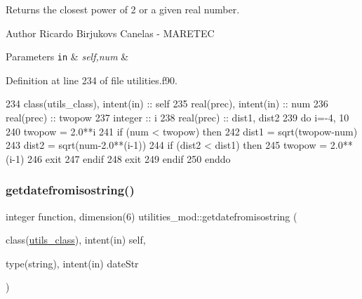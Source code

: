Returns the closest power of 2 or a given real number. 

\begin{DoxyAuthor}{Author}
Ricardo Birjukovs Canelas -\/ M\+A\+R\+E\+T\+EC 
\end{DoxyAuthor}

\begin{DoxyParams}[1]{Parameters}
\mbox{\tt in}  & {\em self,num} & \\
\hline
\end{DoxyParams}


Definition at line 234 of file utilities.\+f90.


\begin{DoxyCode}
234     \textcolor{keywordtype}{class}(utils\_class), \textcolor{keywordtype}{intent(in)} :: self
235     \textcolor{keywordtype}{real(prec)}, \textcolor{keywordtype}{intent(in)} :: num
236     \textcolor{keywordtype}{real(prec)} :: twopow
237     \textcolor{keywordtype}{integer} :: i
238     \textcolor{keywordtype}{real(prec)} :: dist1, dist2
239     \textcolor{keywordflow}{do} i=-4, 10
240         twopow = 2.0**i
241         \textcolor{keywordflow}{if} (num < twopow) \textcolor{keywordflow}{then}
242             dist1 = sqrt(twopow-num)
243             dist2 = sqrt(num-2.0**(i-1))
244             \textcolor{keywordflow}{if} (dist2 < dist1) \textcolor{keywordflow}{then}
245                 twopow = 2.0**(i-1)
246                 \textcolor{keywordflow}{exit}
247 \textcolor{keywordflow}{            endif}
248             \textcolor{keywordflow}{exit}
249 \textcolor{keywordflow}{        endif}
250 \textcolor{keywordflow}{    enddo}
\end{DoxyCode}
\mbox{\label{namespaceutilities__mod_ab5b97f243f9347a40db76d55509d37ca}} 
\subsubsection{\texorpdfstring{getdatefromisostring()}{getdatefromisostring()}}
{\footnotesize\ttfamily integer function, dimension(6) utilities\+\_\+mod\+::getdatefromisostring (\begin{DoxyParamCaption}\item[{class(\mbox{\hyperlink{structutilities__mod_1_1utils__class}{utils\+\_\+class}}), intent(in)}]{self,  }\item[{type(string), intent(in)}]{date\+Str }\end{DoxyParamCaption})\hspace{0.3cm}{\ttfamily [private]}}



